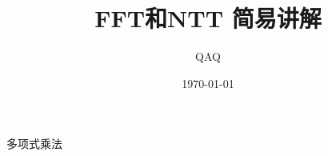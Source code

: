 \documentclass{beamer}
\title{FFT和NTT 简易讲解}
\author{QAQ}
\institute{山东理工大学}
\date{\today}
\begin{document}
\begin{frame}
    \titlepage
\end{frame}
\begin{frame}{多项式乘法}
\end{frame}
\end{document}
